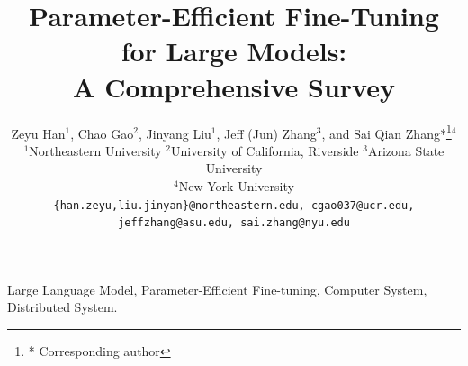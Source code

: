 \documentclass[lettersize,journal]{IEEEtran}
\begin{document}
\title{Parameter-Efficient Fine-Tuning for Large Models: \\A Comprehensive Survey}


\author{Zeyu Han\(^1\), Chao Gao\(^2\), Jinyang Liu\(^1\), Jeff (Jun) Zhang\(^3\), and Sai Qian Zhang*\thanks{* Corresponding author}\(^4\)\\
\(^1\)Northeastern University \quad \(^2\)University of California, Riverside \quad \(^3\)Arizona State University \\ \(^4\)New York University\\
{\tt\small \{han.zeyu,liu.jinyan\}@northeastern.edu, cgao037@ucr.edu, jeffzhang@asu.edu, sai.zhang@nyu.edu}
}





\maketitle

\begin{IEEEkeywords}
Large Language Model, Parameter-Efficient Fine-tuning, Computer System, Distributed System.
\end{IEEEkeywords}





% 



% 
% 


\end{document}
